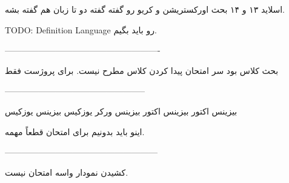 اسلاید ۱۳ و ۱۴ بحث اورکستریشن و کریو رو گفته گفته دو تا زبان هم گفته بشه.

TODO:
Definition Language رو باید بگیم.

-------------------------------------------------------

بحث کلاس بود سر امتحان پیدا کردن کلاس مطرح نیست. برای پروژست فقط

--------------------------------------------------

بیزینس اکتور
بیزینس
اکتور
بیزینس ورکر
یوزکیس
بیزینس یوزکیس

اینو باید بدونیم برای امتحان قطعاً مهمه.

------------------------------------------------------

کشیدن نمودار واسه امتحان نیست.
